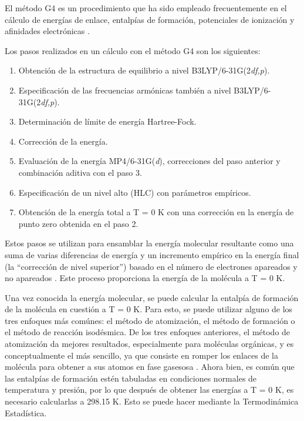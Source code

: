 \documentclass[12pt]{article}
\begin{document}
El método G4 es un procedimiento que ha sido empleado frecuentemente en el cálculo de energías de enlace, entalpías de formación, potenciales de ionización
y afinidades electrónicas  \cite{Cuevas2003, Tajti2004}.

Los pasos realizados en un cálculo con el método G4 son los siguientes:
\begin{enumerate}
        \item Obtención de la estructura de equilibrio a nivel B3LYP/6-31G(2\textit{df,p}).
        \item Especificación de las frecuencias armónicas también a nivel B3LYP/6-31G(2\textit{df,p}).
        \item Determinación de límite de energía Hartree-Fock.
        \item Corrección de la energía.
        \item Evaluación de la energía MP4/6-31G(\textit{d}), correcciones del paso anterior y combinación aditiva con el paso 3.
        \item Especificación de un nivel alto (HLC) con parámetros empíricos.
        \item Obtención de la energía total a T = 0 K con una corrección en la energía de punto zero obtenida en el paso 2.
\end{enumerate}

Estos pasos se utilizan para ensamblar la energía molecular resultante como una suma de varias diferencias de energía y un incremento empírico en la energía final (la ``corrección de nivel superior'') basado en el número de electrones apareados y no apareados  \cite{Curtiss2007}. Este proceso proporciona la energía de la molécula a T = 0 K.

Una vez conocida la energía molecular, se puede calcular la entalpía de formación de la molécula
en cuestión a  T = 0 K. Para esto, se puede utilizar alguno de los tres enfoques más comúnes:
el método de atomización, el método de formación o  el método de reacción isodésmica.
De los tres enfoques anteriores, el método de atomización da mejores resultados, especialmente
para moléculas orgánicas, y es conceptualmente el más sencillo, ya que consiste en romper
los enlaces de la molécula para obtener a sus atomos en fase gasesosa  \cite{Nicolaides1996}. Ahora bien, es común que las entalpías de formación estén tabuladas en condiciones normales de
temperatura y presión, por lo que después de obtener las energías a T = 0 K, es necesario calcularlas
a 298.15 K. Esto se puede hacer mediante la Termodinámica Estadística.
\end{document}
